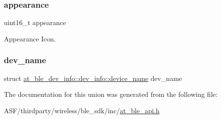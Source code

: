 \subsubsection{\texorpdfstring{appearance}{appearance}}
{\footnotesize\ttfamily uint16\+\_\+t appearance}



Appearance Icon. 

\mbox{\label{unionat__ble__dev__info_1_1dev__info_a009e367e0f749d4d987751fc4c77c0fc}} 
\subsubsection{\texorpdfstring{dev\_name}{dev\_name}}
{\footnotesize\ttfamily struct \mbox{\hyperlink{structat__ble__dev__info_1_1dev__info_1_1device__name}{at\+\_\+ble\+\_\+dev\+\_\+info\+::dev\+\_\+info\+::device\+\_\+name}}  dev\+\_\+name}



The documentation for this union was generated from the following file\+:\begin{DoxyCompactItemize}
\item 
A\+S\+F/thirdparty/wireless/ble\+\_\+sdk/inc/\mbox{\hyperlink{at__ble__api_8h}{at\+\_\+ble\+\_\+api.\+h}}\end{DoxyCompactItemize}
